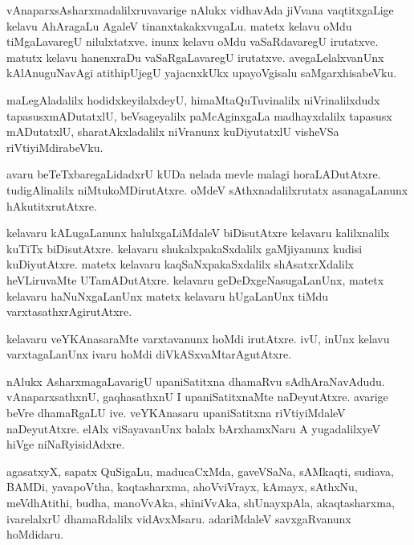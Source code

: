 \documentclass{article}
\begin{document}
\begin{mn}
vAnaparxsAsharxmadalilxruvavarige nAlukx vidhavAda jiVvana
vaqtitxgaLige kelavu AhAragaLu AgaleV tinanxtakakxvugaLu. matetx
kelavu oMdu tiMgaLavaregU nilulxtatxve. inunx kelavu oMdu
vaSaRdavaregU irutatxve. matutx kelavu hanenxraDu vaSaRgaLavaregU
irutatxve. avegaLelalxvanUnx kAlAnuguNavAgi atithipUjegU yajacnxkUkx
upayoVgisalu saMgarxhisabeVku.
\end{mn}

\begin{mn}
maLegAladalilx hodidxkeyilalxdeyU, himaMtaQuTuvinalilx niVrinalilxdudx
tapasusxmADutatxlU, beVsageyalilx paMcAginxgaLa madhayxdalilx tapasusx
mADutatxlU, sharatAkxladalilx niVranunx kuDiyutatxlU visheVSa riVtiyiMdirabeVku.
\end{mn}

\begin{mn}
avaru beTeTxbaregaLidadxrU kUDa nelada mevle malagi
horaLADutAtxre. tudigAlinalilx niMtukoMDirutAtxre. oMdeV
sAthxnadalilxrutatx asanagaLanunx hAkutitxrutAtxre.
\end{mn}

\begin{mn}%
kelavaru kALugaLanunx halulxgaLiMdaleV biDisutAtxre kelavaru
kalilxnalilx kuTiTx biDisutAtxre. kelavaru shukalxpakaSxdalilx
gaMjiyanunx kudisi kuDiyutAtxre. matetx kelavaru kaqSaNxpakaSxdalilx
shAsatxrXdalilx heVLiruvaMte UTamADutAtxre. kelavaru
geDeDxgeNasugaLanUnx, matetx kelavaru haNuNxgaLanUnx matetx kelavaru
hUgaLanUnx tiMdu varxtasathxrAgirutAtxre.
\end{mn}

\begin{mn}
kelavaru veYKAnasaraMte varxtavanunx hoMdi irutAtxre. ivU, inUnx
kelavu varxtagaLanUnx ivaru hoMdi diVkASxvaMtarAgutAtxre.
\end{mn}

\begin{mn}
nAlukx AsharxmagaLavarigU upaniSatitxna dhamaRvu
sAdhAraNavAdudu. vAnaparxsathxnU, gaqhasathxnU I upaniSatitxnaMte
naDeyutAtxre. avarige beVre dhamaRgaLU ive. veYKAnasaru upaniSatitxna
riVtiyiMdaleV naDeyutAtxre. elAlx viSayavanUnx balalx bArxhamxNaru A
yugadalilxyeV hiVge niNaRyisidAdxre.
\end{mn}

\begin{mn}%
agasatxyX, sapatx QuSigaLu, maducaCxMda, gaveVSaNa, sAMkaqti, sudiava,
BAMDi, yavapoVtha, kaqtasharxma, ahoVviVrayx, kAmayx, sAthxNu,
meVdhAtithi, budha, manoVvAka, shiniVvAka, shUnayxpAla, akaqtasharxma,
ivarelalxrU dhamaRdalilx vidAvxMsaru. adariMdaleV savxgaRvanunx hoMdidaru.
\end{mn}
\end{document}
